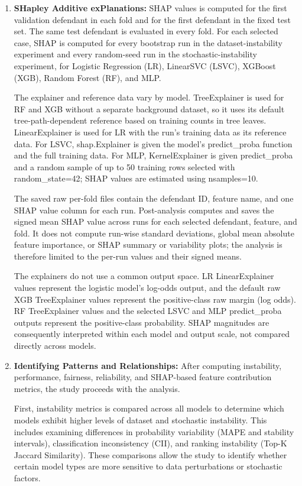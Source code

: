 \documentclass[12pt]{article}
\begin{document}
\begin{enumerate}
  \item \textbf{SHapley Additive exPlanations:}
  SHAP values is computed for the first validation defendant in each fold and for the first defendant in the fixed test set. The same test defendant is evaluated in every fold. For each selected case, SHAP is computed for every bootstrap run in the dataset-instability experiment and every random-seed run in the stochastic-instability experiment, for Logistic Regression (LR), LinearSVC (LSVC), XGBoost (XGB), Random Forest (RF), and MLP.\@

  The explainer and reference data vary by model. TreeExplainer is used for RF and XGB without a separate background dataset, so it uses its default tree-path-dependent reference based on training counts in tree leaves. LinearExplainer is used for LR with the run's training data as its reference data. For LSVC, shap.Explainer is given the model's predict\_proba function and the full training data. For MLP, KernelExplainer is given predict\_proba and a random sample of up to 50 training rows selected with random\_state=42; SHAP values are estimated using nsamples=10.

  The saved raw per-fold files contain the defendant ID, feature name, and one SHAP value column for each run. Post-analysis computes and saves the signed mean SHAP value across runs for each selected defendant, feature, and fold. It does not compute run-wise standard deviations, global mean absolute feature importance, or SHAP summary or variability plots; the analysis is therefore limited to the per-run values and their signed means.

  The explainers do not use a common output space. LR LinearExplainer values represent the logistic model's log-odds output, and the default raw XGB TreeExplainer values represent the positive-class raw margin (log odds). RF TreeExplainer values and the selected LSVC and MLP predict\_proba outputs represent the positive-class probability. SHAP magnitudes are consequently interpreted within each model and output scale, not compared directly across models.

  \item \textbf{Identifying Patterns and Relationships:}
  After computing instability, performance, fairness, reliability, and SHAP-based feature contribution metrics,  the study proceeds with the analysis.
  
  First, instability metrics is compared across all models to determine which models exhibit higher levels of dataset and stochastic instability. This includes examining differences in probability variability (MAPE and stability intervals), classification inconsistency (CII), and ranking instability (Top-K Jaccard Similarity). These comparisons allow the study to identify whether certain model types are more sensitive to data perturbations or stochastic factors.


\end{enumerate}
\end{document}
